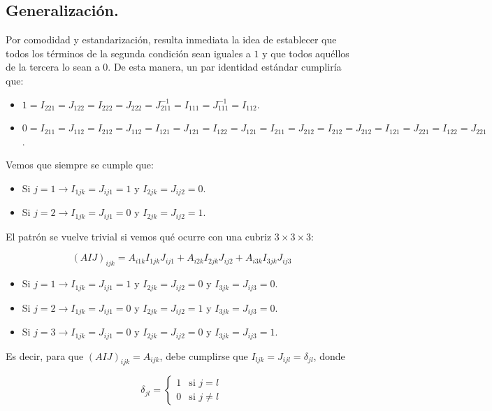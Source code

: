 \documentclass[a4paper, titlepage]{article}
\begin{document}
\subsection{Generalización.}

Por comodidad y estandarización, resulta inmediata la idea de establecer que todos los términos de la segunda condición sean iguales a $1$ y que todos aquéllos de la tercera lo sean a $0$. De esta manera, un par identidad estándar cumpliría que:

\begin{itemize}
	\item $1 = I_{221} = J_{122} = I_{222} = J_{222} = J_{211}^{-1} = I_{111} = J_{111}^{-1} = I_{112}$.
	\item $0 = I_{211} = J_{112} = I_{212} = J_{112} = I_{121} = J_{121} = I_{122} = J_{121} = I_{211} = J_{212} = I_{212} = J_{212} = I_{121} = J_{221} = I_{122} = J_{221}$.
\end{itemize}

Vemos que siempre se cumple que:

\begin{itemize}
	\item Si $j = 1 \rightarrow I_{1jk} = J_{ij1} = 1$ y $I_{2jk} = J_{ij2} = 0$.
	\item Si $j = 2 \rightarrow I_{1jk} = J_{ij1} = 0$ y $I_{2jk} = J_{ij2} = 1$.
\end{itemize}

El patrón se vuelve trivial si vemos qué ocurre con una cubriz $3 \times 3 \times 3$:

$$(AIJ)_{ijk} = A_{i1k} I_{1jk} J_{ij1} + A_{i2k} I_{2jk} J_{ij2} + A_{i3k} I_{3jk} J_{ij3}$$

\begin{itemize}
	\item Si $j = 1 \rightarrow I_{1jk} = J_{ij1} = 1$ y $I_{2jk} = J_{ij2} = 0$ y $I_{3jk} = J_{ij3} = 0$.
	\item Si $j = 2 \rightarrow I_{1jk} = J_{ij1} = 0$ y $I_{2jk} = J_{ij2} = 1$ y $I_{3jk} = J_{ij3} = 0$.
	\item Si $j = 3 \rightarrow I_{1jk} = J_{ij1} = 0$ y $I_{2jk} = J_{ij2} = 0$ y $I_{3jk} = J_{ij3} = 1$.
\end{itemize}

Es decir, para que $(AIJ)_{ijk} = A_{ijk}$, debe cumplirse que $I_{ljk} = J_{ijl} = \delta_{jl}$, donde

\begin{equation}
	\delta_{jl} =
	\begin{cases}
		1 & \text{si } j = l \\
		0 & \text{si } j \neq l
	\end{cases}
\end{equation}
\end{document}
